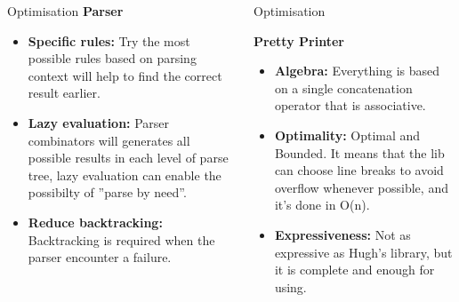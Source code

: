 \documentclass[final]{beamer}
\newlength{\onecolwid}
\newlength{\twocolwid}
\begin{document}
\begin{frame}[t]
\begin{columns}[t]
\begin{column}{\twocolwid}
\begin{columns}[t,totalwidth=\twocolwid]
\begin{column}{\onecolwid}
\begin{block}{Optimisation}
\textbf{Parser}
\begin{itemize}
\item \textbf{Specific rules:} Try the most possible rules based on parsing context will help to find the correct result earlier.
\item \textbf{Lazy evaluation:} Parser combinators will generates all possible results in each level
of parse tree, lazy evaluation can enable the possibilty of ''parse by need''.
\item \textbf{Reduce backtracking:} Backtracking is required when the parser encounter a failure.

\end{itemize}

\end{block}


\end{column} %

\begin{column}{\onecolwid} %


\begin{block}{Optimisation}



\textbf{Pretty Printer}
\begin{itemize}
\item \textbf{Algebra:} Everything is based on a single concatenation operator that is associative.
\item \textbf{Optimality:} Optimal and Bounded. It means that the lib can choose line breaks to avoid overflow whenever possible, and it's done in O(n).
\item \textbf{Expressiveness:} Not as expressive as Hugh's library, but it is complete and enough for using.

\end{itemize}





\end{block}
\end{column}
\end{columns}
\end{column}
\end{columns}
\end{frame}
\end{document}
